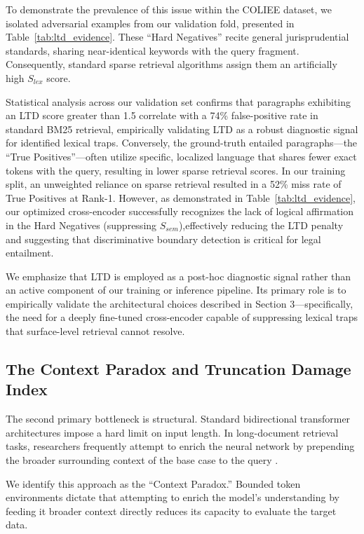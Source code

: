 \documentclass[sigconf]{acmart}
\newcommand{\rev}[1]{{\color{blue}#1}}
\begin{document}
To demonstrate the prevalence of this issue within the COLIEE dataset, we isolated adversarial examples from our validation fold, presented in Table~\ref{tab:ltd_evidence}. These ``Hard Negatives'' recite general jurisprudential standards, sharing near-identical keywords with the query fragment. Consequently, standard sparse retrieval algorithms assign them an artificially high $S_{lex}$ score.

Statistical analysis across our validation set confirms that paragraphs exhibiting an LTD score greater than 1.5 correlate with a 74\% false-positive rate in standard BM25 retrieval, empirically validating LTD as a robust diagnostic signal for identified lexical traps. Conversely, the ground-truth entailed paragraphs---the ``True Positives''---often utilize specific, localized language that shares fewer exact tokens with the query, resulting in lower sparse retrieval scores. In our training split, an unweighted reliance on sparse retrieval resulted in a 52\% miss rate of True Positives at Rank-1. However, as demonstrated in Table~\ref{tab:ltd_evidence}, our optimized cross-encoder successfully recognizes the lack of logical affirmation in the Hard Negatives (suppressing $S_{sem}$),effectively reducing the LTD penalty and suggesting that discriminative boundary detection is critical for legal entailment.

\rev{We emphasize that LTD is employed as a post-hoc diagnostic signal rather than an active component of our training or inference pipeline. Its primary role is to empirically validate the architectural choices described in Section 3---specifically, the need for a deeply fine-tuned cross-encoder capable of suppressing lexical traps that surface-level retrieval cannot resolve.}


\subsection{The Context Paradox and Truncation Damage Index}

The second primary bottleneck is structural. Standard bidirectional transformer architectures impose a hard limit on input length. In long-document retrieval tasks, researchers frequently attempt to enrich the neural network by prepending the broader surrounding context of the base case to the query \cite{lewis2020retrieval}.

We identify this approach as the ``Context Paradox.'' Bounded token environments dictate that attempting to enrich the model's understanding by feeding it broader context directly reduces its capacity to evaluate the target data. 
\end{document}
